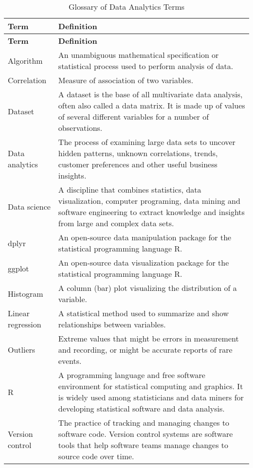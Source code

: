 \documentclass[
]{article}
\begin{document}
\begin{longtable}[]{@{}
  >{\raggedright\arraybackslash}p{}
  >{\raggedright\arraybackslash}p{}@{}}
\caption{Glossary of Data Analytics Terms}\tabularnewline
\toprule
\textbf{Term} & \textbf{Definition} \\
\midrule
\endfirsthead
\toprule
\textbf{Term} & \textbf{Definition} \\
\midrule
\endhead
Algorithm & An unambiguous mathematical specification or statistical
process used to perform analysis of data. \\
Correlation & Measure of association of two variables. \\
Dataset & A dataset is the base of all multivariate data analysis, often
also called a data matrix. It is made up of values of several different
variables for a number of observations. \\
Data analytics & The process of examining large data sets to uncover
hidden patterns, unknown correlations, trends, customer preferences and
other useful business insights. \\
Data science & A discipline that combines statistics, data
visualization, computer programing, data mining and software engineering
to extract knowledge and insights from large and complex data sets. \\
dplyr & An open-source data manipulation package for the statistical
programming language R. \\
ggplot & An open-source data visualization package for the statistical
programming language R. \\
Histogram & A column (bar) plot visualizing the distribution of a
variable. \\
Linear regression & A statistical method used to summarize and show
relationships between variables. \\
Outliers & Extreme values that might be errors in measurement and
recording, or might be accurate reports of rare events. \\
R & A programming language and free software environment for statistical
computing and graphics. It is widely used among statisticians and data
miners for developing statistical software and data analysis. \\
Version control & The practice of tracking and managing changes to
software code. Version control systems are software tools that help
software teams manage changes to source code over time. \\
\bottomrule
\end{longtable}
\end{document}
